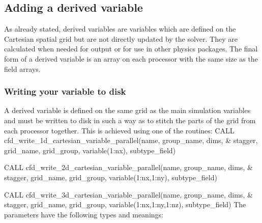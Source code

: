 \documentclass[12pt,a4paper]{article}
\newenvironment{boxverbatim}{\lboxverbatim{none}}{\endlboxverbatim}
\begin{document}
\subsection{Adding a derived variable}

As already stated, derived variables are variables which are defined on the
Cartesian spatial grid but are not directly updated by the solver. They are
calculated when needed for output or for use in other physics packages. The
final form of a derived variable is an array on each processor with the same
size as the field arrays.

\subsubsection{Writing your variable to disk}
A derived variable is defined on the same grid as the main simulation variables
and must be written to disk in such a way as to stitch the parts of the grid
from each processor together. This is achieved using one of the routines:
\begin{boxverbatim}
CALL cfd_write_1d_cartesian_variable_parallel(name, group_name, dims, &
    stagger, grid_name, grid_group, variable(1:nx), subtype_field)

CALL cfd_write_2d_cartesian_variable_parallel(name, group_name, dims, &
    stagger, grid_name, grid_group, variable(1:nx,1:ny), subtype_field)

CALL cfd_write_3d_cartesian_variable_parallel(name, group_name, dims, &
    stagger, grid_name, grid_group, variable(1:nx,1:ny,1:nz), subtype_field)
\end{boxverbatim}
The parameters have the following types and meanings:
\end{document}
